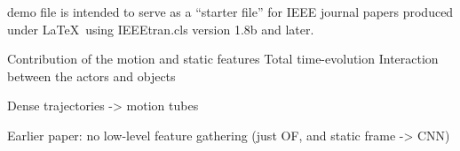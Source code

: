  demo file is intended to serve as a ``starter file''
for IEEE journal papers produced under \LaTeX\ using
IEEEtran.cls version 1.8b and later.




Contribution of the motion and static features
Total time-evolution
Interaction between the actors and objects

Dense trajectories -> motion tubes

Earlier paper: no low-level feature gathering (just OF, and static frame -> CNN)


\cite{LAMPOR94}